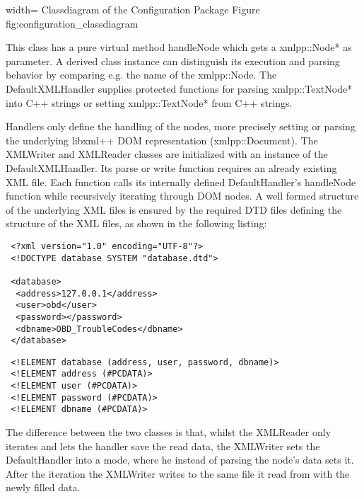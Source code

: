  {width=\textwidth}%
 {Classdiagram of the Configuration Package}%
 {Figure}%
 {fig:configuration_classdiagram}%

This class has a pure virtual method handleNode which gets a xmlpp::Node* as parameter. A derived class instance can distinguish its execution 
and parsing behavior by comparing e.g. the name of the xmlpp::Node. The DefaultXMLHandler supplies protected functions for parsing 
xmlpp::TextNode* into C++ strings or setting xmlpp::TextNode* from C++ strings. 

Handlers only define the handling of the nodes, more precisely setting or parsing the underlying libxml++ DOM representation (xmlpp::Document). 
The XMLWriter and XMLReader classes are initialized with an instance of the DefaultXMLHandler. Its parse or write function requires an already 
existing XML file. Each function calls its internally defined DefaultHandler’s handleNode function while recursively iterating through DOM nodes. 
A well formed structure of the underlying XML files is ensured by the required DTD files defining the structure of the XML files, as shown in the following listing:

\begin{verbatim}
 <?xml version="1.0" encoding="UTF-8"?>
 <!DOCTYPE database SYSTEM "database.dtd">

 <database>
  <address>127.0.0.1</address>
  <user>obd</user>
  <password></password>
  <dbname>OBD_TroubleCodes</dbname>
 </database>
\end{verbatim}

\begin{verbatim}
 <!ELEMENT database (address, user, password, dbname)>
 <!ELEMENT address (#PCDATA)>
 <!ELEMENT user (#PCDATA)>
 <!ELEMENT password (#PCDATA)>
 <!ELEMENT dbname (#PCDATA)>
\end{verbatim}

The difference between the two classes is that, whilst the XMLReader only iterates and lets the handler save the read data, the XMLWriter sets 
the DefaultHandler into a mode, where he instead of parsing the node’s data sets it. After the iteration the XMLWriter writes to the same file 
it read from with the newly filled data.


